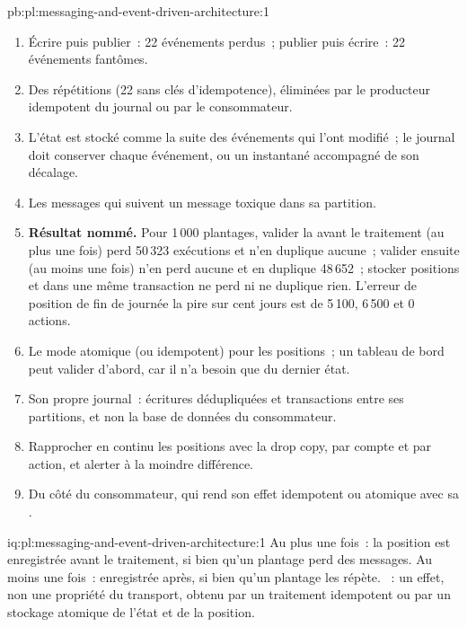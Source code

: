 \begin{solution}{pb:pl:messaging-and-event-driven-architecture:1}
\begin{enumerate}
\item Écrire puis publier~: 22 événements perdus~; publier puis écrire~: 22 événements fantômes.
\item Des répétitions (22 sans clés d'idempotence), éliminées par le producteur idempotent du journal ou par le consommateur.
\item L'état est stocké comme la suite des événements qui l'ont modifié~; le journal doit conserver chaque événement, ou un instantané accompagné de son décalage.
\item Les messages qui suivent un message toxique dans sa partition.
\item \textbf{Résultat nommé.} Pour 1\,000 plantages, valider la  avant le traitement (au plus une fois) perd 50\,323 exécutions et n'en duplique aucune~;
valider ensuite (au moins une fois) n'en perd aucune et en duplique 48\,652~; stocker positions et  dans une même transaction ne perd ni ne duplique
rien. L'erreur de position de fin de journée la pire sur cent jours est de 5\,100, 6\,500 et 0 actions.
\item Le mode atomique (ou idempotent) pour les positions~; un tableau de bord peut valider d'abord, car il n'a besoin que du dernier état.
\item Son propre journal~: écritures dédupliquées et transactions entre ses partitions, et non la base de données du consommateur.
\item Rapprocher en continu les positions avec la drop copy, par compte et par action, et alerter à la moindre différence.
\item Du côté du consommateur, qui rend son effet idempotent ou atomique avec sa .
\end{enumerate}
\end{solution}

\begin{solution}{iq:pl:messaging-and-event-driven-architecture:1}
Au plus une fois~: la position est enregistrée avant le traitement, si bien qu'un plantage perd des messages. Au moins une fois~: enregistrée après, si bien qu'un plantage les répète.
~: un effet, non une propriété du transport, obtenu par un traitement idempotent ou par un stockage atomique de l'état et de la position.
\end{solution}

